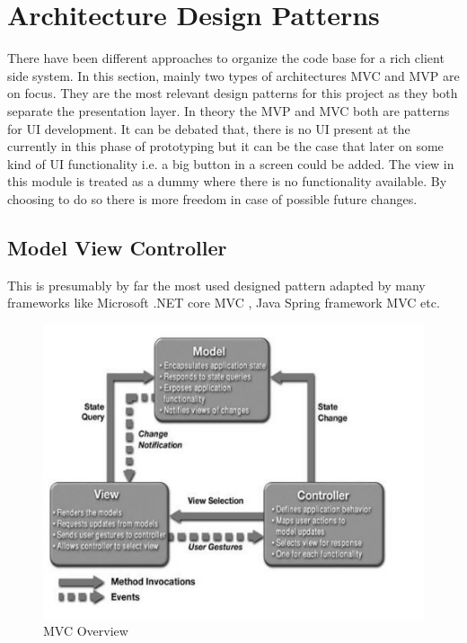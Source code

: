 \newpage
\section{Architecture Design Patterns}
    There have been different approaches to organize the code base for a rich client side 
    system. In this section, mainly two types of architectures
    MVC \cite{mvc} and MVP \cite{mvp} are on focus. 
    They are the most relevant design patterns
    for this project as they both separate the presentation layer. 
    In theory the MVP and MVC both are patterns for UI development. It can
    be debated that, there is no UI present at the currently in this phase of prototyping but
    it can be the case that later on some kind of UI functionality i.e. a big button in a
    screen could be added. The view in this module is treated as a dummy where there is no functionality
    available. By choosing to do so there is more freedom in case of possible future changes. 

    \subsection{Model View Controller}
        \label{ssec:mvc}
        This is presumably by far the most used designed pattern adapted by many frameworks like
        Microsoft .NET core MVC \cite{MicrosoftMVC}, 
        Java Spring framework MVC \cite{JavaSpring} etc. 

        \begin{figure}[htbp!]
            \centering \includegraphics{grafiken/mvc_hotop.jpg}
            \caption{MVC Overview \cite{Hotop2015}}
            \label{fig:mvcOverview}
        \end{figure}


